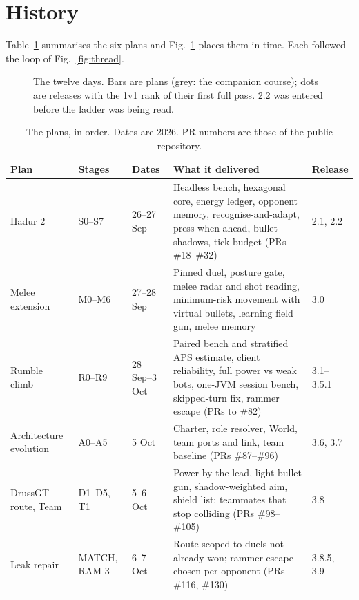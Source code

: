 \documentclass[10pt,twocolumn]{article}
\begin{document}
\section{History}\label{sec:history}

Table~\ref{tab:plans} summarises the six plans and Fig.~\ref{fig:timeline} places them in time.
Each followed the loop of Fig.~\ref{fig:thread}.

\begin{figure}[t]
\centering
\resizebox{\textwidth}{!}{}
\caption{The twelve days. Bars are plans (grey: the companion course); dots are releases with the
1v1 rank of their first full pass. 2.2 was entered before the ladder was being read.}
\label{fig:timeline}
\end{figure}

\begin{table}[t]
\centering
\caption{The plans, in order. Dates are 2026. PR numbers are those of the public repository.}
\label{tab:plans}
\small
\begin{tabularx}{\textwidth}{@{}l l l X l@{}}
\toprule
Plan & Stages & Dates & What it delivered & Release \\
\midrule
Hadur 2 & S0--S7 & 26--27 Sep & Headless bench, hexagonal core, energy ledger, opponent memory, recognise-and-adapt, press-when-ahead, bullet shadows, tick budget (PRs \#18--\#32) & 2.1, 2.2 \\
Melee extension & M0--M6 & 27--28 Sep & Pinned duel, posture gate, melee radar and shot reading, minimum-risk movement with virtual bullets, learning field gun, melee memory & 3.0 \\
Rumble climb & R0--R9 & 28 Sep--3 Oct & Paired bench and stratified APS estimate, client reliability, full power vs weak bots, one-JVM session bench, skipped-turn fix, rammer escape (PRs to \#82) & 3.1--3.5.1 \\
Architecture evolution & A0--A5 & 5 Oct & Charter, role resolver, World, team ports and link, team baseline (PRs \#87--\#96) & 3.6, 3.7 \\
DrussGT route, Team & D1--D5, T1 & 5--6 Oct & Power by the lead, light-bullet gun, shadow-weighted aim, shield list; teammates that stop colliding (PRs \#98--\#105) & 3.8 \\
Leak repair & MATCH, RAM-3 & 6--7 Oct & Route scoped to duels not already won; rammer escape chosen per opponent (PRs \#116, \#130) & 3.8.5, 3.9 \\
\bottomrule
\end{tabularx}
\end{table}
\end{document}
